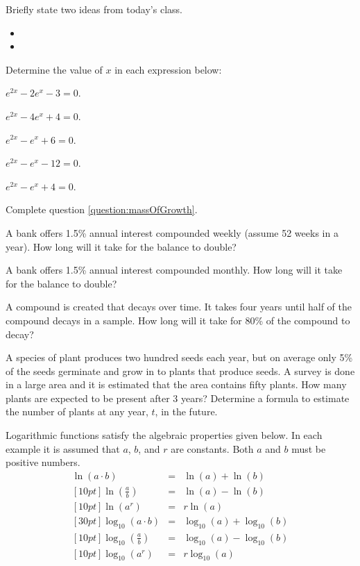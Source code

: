 \postClass

\begin{problem}
\item Briefly state two ideas from today's class.
  \begin{itemize}
  \item
  \item
  \end{itemize}
\item Determine the value of $x$ in each expression below:
  \begin{subproblem}
  \item $e^{2x} - 2 e^{x} - 3 = 0$.
  \item $e^{2x} - 4 e^{x} + 4 = 0$.
  \item $e^{2x} -   e^{x} + 6 = 0$.
  \item $e^{2x} -   e^{x} - 12 = 0$.
  \item $e^{2x} - e^{x} + 4 = 0$.
  \end{subproblem}
\item Complete question \ref{question:massOfGrowth}.
\item A bank offers 1.5\% annual interest compounded weekly (assume 52
  weeks in a year). How long will it take for the balance to double?
\item A bank offers 1.5\% annual interest compounded monthly. How long
  will it take for the balance to double?
\item A compound is created that decays over time. It takes four years
  until half of the compound decays in a sample. How long will it take
  for 80\% of the compound to decay?
\item A species of plant produces two hundred seeds each year, but on average only 5\%
  of the seeds germinate and grow in to plants that produce seeds. A survey
  is done in a large area and it is estimated that the area contains fifty
  plants. How many plants are expected to be present after 3 years? Determine
  a formula to estimate the number of plants at any year, $t$, in the future.
\end{problem}




Logarithmic functions satisfy the algebraic properties given below. In
each example it is assumed that $a$, $b$, and $r$ are constants. Both
$a$ and $b$ must be positive numbers.
\begin{eqnarray}
  \ln(a\cdot b) & = & \ln(a) + \ln(b) \\ [10pt]
  \ln\left(\frac{a}{b}\right) & = & \ln(a) - \ln(b) \\  [10pt]
  \ln\left(a^r\right) & = & r \ln(a) \\ [30pt]
  \log_{10}(a\cdot b) & = & \log_{10}(a) + \log_{10}(b) \\ [10pt]
  \log_{10}\left(\frac{a}{b}\right) & = & \log_{10}(a) - \log_{10}(b) \\  [10pt]
  \log_{10}\left(a^r\right) & = & r \log_{10}(a)
\end{eqnarray}


